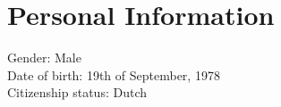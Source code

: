 \section{Personal Information}
\begin{flushleft}
  Gender: Male \\
  Date of birth: 19th of September, 1978 \\
  Citizenship status: Dutch
\end{flushleft} 
